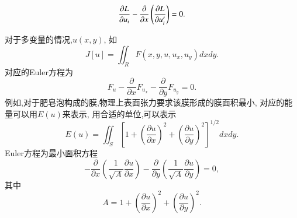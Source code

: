 \begin{equation}
  \frac{\partial{L}}{\partial{u_i}} -  \frac{\partial{}}{\partial{x}}\left( \frac{\partial{L}}{\partial{u'_i}} \right) = 0 .
\end{equation}

对于多变量的情况,$u(x,y)$, 如
\begin{equation}
J[u]=\iint_R F\left(x, y, u, u_x, u_y\right) d x d y .
\end{equation}
对应的Euler方程为
\begin{equation}
F_u-\frac{\partial}{\partial x} F_{u_x}-\frac{\partial}{\partial y} F_{u_y}=0.
\end{equation}
例如,对于肥皂泡构成的膜,物理上表面张力要求该膜形成的膜面积最小, 对应的能量可以用$E(u)$来表示,
用合适的单位,可以表示
$$
E(u)=\iint_S\left[1+\left(\frac{\partial u}{\partial x}\right)^2+\left(\frac{\partial u}{\partial y}\right)^2\right]^{1 / 2} d x d y.
$$
Euler方程为最小面积方程
$$
-\frac{\partial}{\partial x}\left(\frac{1}{\sqrt{A}} \frac{\partial u}{\partial x}\right)-\frac{\partial}{\partial y}\left(\frac{1}{\sqrt{A}} \frac{\partial u}{\partial y}\right)=0,
$$
其中
$$
A=1+\left(\frac{\partial u}{\partial x}\right)^2+\left(\frac{\partial u}{\partial y}\right)^2.
$$







